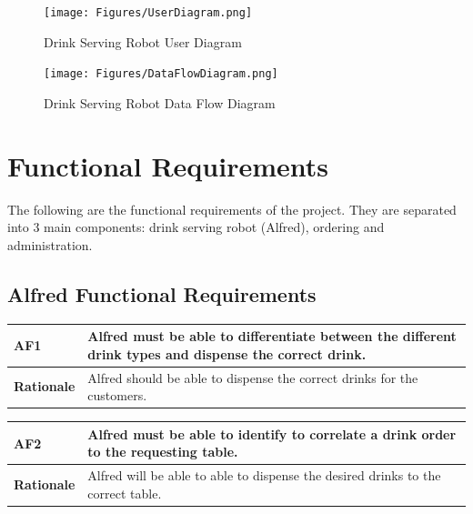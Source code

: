 \documentclass [11pt]{article}
\begin{document}
\begin{figure} [h!]
	\centering
	\texttt{[image: Figures/UserDiagram.png]}
	\caption{Drink Serving Robot User Diagram}
\end{figure}

\pagebreak
\begin{figure} [h!]
	\centering
	\texttt{[image: Figures/DataFlowDiagram.png]}
	\caption{Drink Serving Robot Data Flow Diagram}
\end{figure}



\section {Functional Requirements} 
The following are the functional requirements of the project. They are separated into 3 main components: drink serving robot (Alfred), ordering and administration.

\subsection{Alfred Functional Requirements}

\begin{longtable}{| p{ } | p{ } | }\hline 
\rowcolor{tableCell}\textbf{AF1} & Alfred must be able to differentiate between the different drink types and dispense the correct drink.\\ \hline
\textbf{Rationale} & Alfred should be able to dispense the correct drinks for the customers.\\ \hline 
\end{longtable}

\begin{longtable}{| p{ } | p{ } | }\hline 
\rowcolor{tableCell}\textbf{AF2} & Alfred must be able to identify to correlate a drink order to the requesting table.\\ \hline
\textbf{Rationale} &  Alfred will be able to able to dispense the desired drinks to the correct table.\\ \hline 
\end{longtable}
\end{document}
